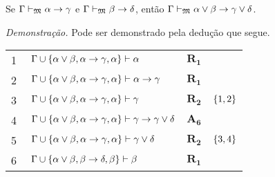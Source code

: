 \vspace{.5\baselineskip}
\begin{tcolorbox}[enhanced jigsaw, breakable, sharp corners, colframe=black, colback=white, boxrule=0.5pt, left=1.5mm, right=1.5mm, top=1.5mm, bottom=1.5mm]
    \begin{lemma}\label{disjunction.exchange}
        Se $\Gamma\mathrel{\vdash}_\mathfrak{M}\alpha\to\gamma$ e $\Gamma\mathrel{\vdash}_\mathfrak{M}\beta\to\delta$, então $\Gamma\mathrel{\vdash}_\mathfrak{M}\alpha\vee\beta\to\gamma\vee\delta$.
    \end{lemma}

        \emph{Demonstração.}
        Pode ser demonstrado pela dedução que segue.

        \vspace{\baselineskip}
        \footnotesize
        \setlength{\rowskip}{0.5\baselineskip}
        \begin{xltabular}{\textwidth}{r | X l l}
            \scriptsize{\phantom{0}1}\phantom{ } & $\ \Gamma\cup\set{\alpha\vee\beta,\alpha\to\gamma,\alpha}\vdash\alpha$                                                                  & $\hyperref[modal.rule.1]{\mathbf{R_1}}$\phantom{1} & \\[\rowskip]
            \scriptsize{\phantom{0}2}\phantom{ } & $\ \Gamma\cup\set{\alpha\vee\beta,\alpha\to\gamma,\alpha}\vdash\alpha\to\gamma$                                                         & $\hyperref[modal.rule.1]{\mathbf{R_1}}$            & \\[\rowskip]
            \scriptsize{\phantom{0}3}\phantom{ } & $\ \Gamma\cup\set{\alpha\vee\beta,\alpha\to\gamma,\alpha}\vdash\gamma$                                                                  & $\hyperref[modal.rule.2]{\mathbf{R_2}}$            & $\left\{1,2\right\}$\\[\rowskip]
            \scriptsize{\phantom{0}4}\phantom{ } & $\ \Gamma\cup\set{\alpha\vee\beta,\alpha\to\gamma,\alpha}\vdash\gamma\to\gamma\vee\delta$                                               & $\hyperref[modal.axiom.6]{\mathbf{A_6}}$           & \\[\rowskip]
            \scriptsize{\phantom{0}5}\phantom{ } & $\ \Gamma\cup\set{\alpha\vee\beta,\alpha\to\gamma,\alpha}\vdash\gamma\vee\delta$                                                        & $\hyperref[modal.rule.2]{\mathbf{R_2}}$            & $\left\{3,4\right\}$\\[\rowskip]
            \scriptsize{\phantom{0}6}\phantom{ } & $\ \Gamma\cup\set{\alpha\vee\beta,\beta\to\delta,\beta}\vdash\beta$                                                                     & $\hyperref[modal.rule.1]{\mathbf{R_1}}$            & \\[\rowskip]

\end{xltabular}
\end{tcolorbox}
